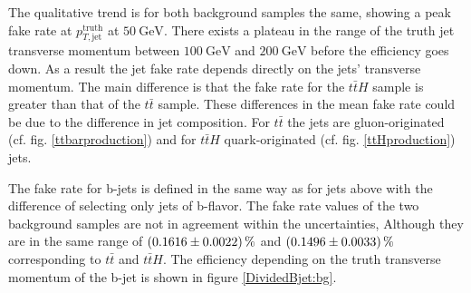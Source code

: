 %
The qualitative trend is for both background samples the same, showing a peak fake rate at $p_{T,\text{jet}}^{\text{truth}}$ at $\SI{50}{\giga\electronvolt}$. There exists a plateau in the range of the truth jet transverse momentum between $\SI{100}{\giga\electronvolt}$ and $\SI{200}{\giga\electronvolt}$ before the efficiency goes down. As a result the jet fake rate depends directly on the jets' transverse momentum. The main difference is that the fake rate for the $t\bar{t}H$ sample is greater than that of the $t\bar{t}$ sample. These differences in the mean fake rate could be due to the difference in jet composition. For $t\bar{t}$ the jets are gluon-originated (cf. fig. \ref{ttbarproduction}) and for $t\bar{t}H$ quark-originated (cf. fig. \ref{ttHproduction}) jets.\par
The fake rate for b-jets is defined in the same way as for jets above with the difference of selecting only jets of b-flavor. The fake rate values of the two background samples are not in agreement within the uncertainties, Although they are in the same range of $\SI{0.1616\pm 0.0022}{\percent}$ and $\SI{0.1496\pm 0.0033}{\percent}$ corresponding to $t\bar{t}$ and $t\bar{t}H$. The efficiency depending on the truth transverse momentum of the b-jet is shown in figure \ref{DividedBjet:bg}.
%
